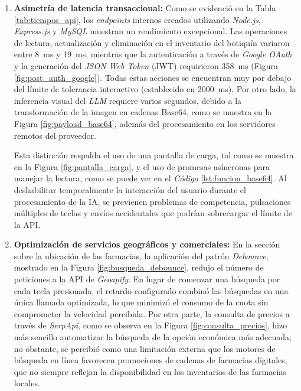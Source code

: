 \begin{enumerate}
    \item \textbf{Asimetría de latencia transaccional:} Como se evidenció en la Tabla \ref{tab:tiempos_api}, los \emph{endpoints} internos creados utilizando \emph{Node.js}, \emph{Express.js} y \emph{MySQL} muestran un rendimiento excepcional. Las operaciones de lectura, actualización y eliminación en el inventario del botiquín variaron entre 8~ms y 19~ms, mientras que la autenticación a través de \emph{Google OAuth} y la generación del \emph{JSON Web Token} ({JWT}) requirieron 358~ms (Figura \ref{fig:post_auth_google}). Todas estas acciones se encuentran muy por debajo del límite de tolerancia interactivo (establecido en 2000~ms). Por otro lado, la inferencia visual del \emph{LLM} requiere varios segundos, debido a la transformación de la imagen en cadenas Base64, como se muestra en la Figura \ref{fig:payload_base64}, además del procesamiento en los servidores remotos del proveedor.
    
    Esta distinción respalda el uso de una pantalla de carga, tal como se muestra en la Figura \ref{fig:pantalla_carga}, y el uso de promesas asíncronas para manejar la lectura, como se puede ver en el \emph{Código} \ref{lst:funcion_base64}. Al deshabilitar temporalmente la interacción del usuario durante el procesamiento de la {IA}, se previenen problemas de competencia, pulsaciones múltiples de teclas y envíos accidentales que podrían sobrecargar el límite de la {API}.
    
    \item \textbf{Optimización de servicios geográficos y comerciales:} En la sección sobre la ubicación de las farmacias, la aplicación del patrón \emph{Debounce}, mostrado en la Figura \ref{fig:busqueda_debounce}, redujo el número de peticiones a la {API} de \emph{Geoapify}. En lugar de comenzar una búsqueda por cada tecla presionada, el retardo configurado combinó las búsquedas en una única llamada optimizada, lo que minimizó el consumo de la cuota sin comprometer la velocidad percibida. Por otra parte, la consulta de precios a través de \emph{SerpApi}, como se observa en la Figura \ref{fig:consulta_precios}, hizo más sencillo automatizar la búsqueda de la opción económica más adecuada; no obstante, se percibió como una limitación externa que los motores de búsqueda en línea favorecen promociones de cadenas de farmacias digitales, que no siempre reflejan la disponibilidad en los inventarios de las farmacias locales.
    

\end{enumerate}

